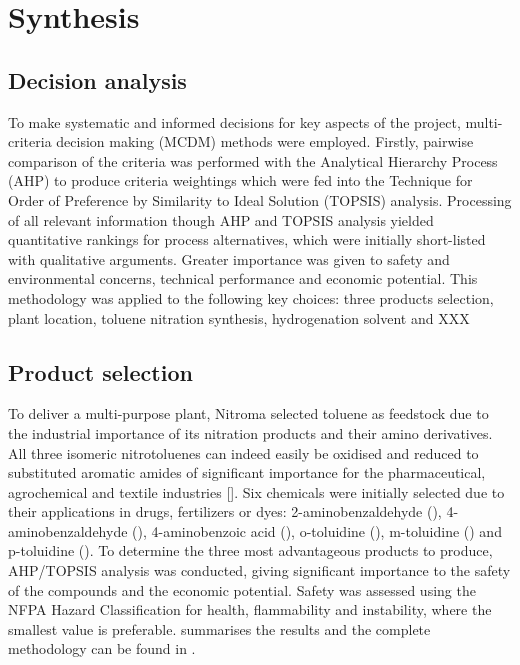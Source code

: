 \section{Synthesis}
\label{sec:synthesis}
\subsection{Decision analysis}
To make systematic and informed decisions for key aspects of the project, multi-criteria decision making (MCDM) methods were employed. Firstly, pairwise comparison of the criteria was performed with the Analytical Hierarchy Process (AHP) to produce criteria weightings which were fed into the Technique for Order of Preference by Similarity to Ideal Solution (TOPSIS) analysis. Processing of all relevant information though AHP and TOPSIS analysis yielded quantitative rankings for process alternatives, which were initially short-listed with qualitative arguments. Greater importance was given to safety and environmental concerns, technical performance and economic potential.
This methodology was applied to the following key choices: three products selection, plant location, toluene nitration synthesis, hydrogenation solvent and XXX 

\subsection{Product selection}
To deliver a multi-purpose plant, Nitroma selected toluene as feedstock due to the industrial importance of its nitration products and their amino derivatives. All three isomeric nitrotoluenes can indeed easily be oxidised and reduced to substituted aromatic amides of significant importance for the pharmaceutical, agrochemical and textile industries []. Six chemicals were initially selected due to their applications in drugs, fertilizers or dyes: 2-aminobenzaldehyde (), 4-aminobenzaldehyde (), 4-aminobenzoic acid (), o-toluidine (), m-toluidine () and p-toluidine (). To determine the three most advantageous products to produce, AHP/TOPSIS analysis was conducted, giving significant importance to the safety of the compounds and the economic potential. Safety was assessed using the NFPA Hazard Classification for health, flammability and instability, where the smallest value is preferable. summarises the results and the complete methodology can be found in .   


